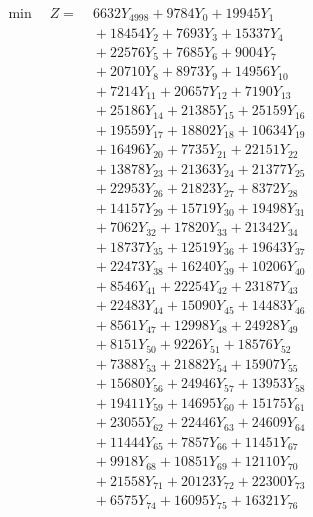 \documentclass[a4paper,10pt]{article}
\begin{document}
\allowdisplaybreaks
{\small
\begin{align}
\min \quad Z = &\; 6632 Y_{4998} + 9784 Y_{0} + 19945 Y_{1} \\[0.3ex]
&\;  + 18454 Y_{2} + 7693 Y_{3} + 15337 Y_{4} \\[0.3ex]
&\;  + 22576 Y_{5} + 7685 Y_{6} + 9004 Y_{7} \\[0.3ex]
&\;  + 20710 Y_{8} + 8973 Y_{9} + 14956 Y_{10} \\[0.3ex]
&\;  + 7214 Y_{11} + 20657 Y_{12} + 7190 Y_{13} \\[0.3ex]
&\;  + 25186 Y_{14} + 21385 Y_{15} + 25159 Y_{16} \\[0.3ex]
&\;  + 19559 Y_{17} + 18802 Y_{18} + 10634 Y_{19} \\[0.3ex]
&\;  + 16496 Y_{20} + 7735 Y_{21} + 22151 Y_{22} \\[0.3ex]
&\;  + 13878 Y_{23} + 21363 Y_{24} + 21377 Y_{25} \\[0.3ex]
&\;  + 22953 Y_{26} + 21823 Y_{27} + 8372 Y_{28} \\[0.5ex]\allowbreak
&\;  + 14157 Y_{29} + 15719 Y_{30} + 19498 Y_{31} \\[0.3ex]
&\;  + 7062 Y_{32} + 17820 Y_{33} + 21342 Y_{34} \\[0.3ex]
&\;  + 18737 Y_{35} + 12519 Y_{36} + 19643 Y_{37} \\[0.3ex]
&\;  + 22473 Y_{38} + 16240 Y_{39} + 10206 Y_{40} \\[0.3ex]
&\;  + 8546 Y_{41} + 22254 Y_{42} + 23187 Y_{43} \\[0.3ex]
&\;  + 22483 Y_{44} + 15090 Y_{45} + 14483 Y_{46} \\[0.3ex]
&\;  + 8561 Y_{47} + 12998 Y_{48} + 24928 Y_{49} \\[0.3ex]
&\;  + 8151 Y_{50} + 9226 Y_{51} + 18576 Y_{52} \\[0.3ex]
&\;  + 7388 Y_{53} + 21882 Y_{54} + 15907 Y_{55} \\[0.3ex]
&\;  + 15680 Y_{56} + 24946 Y_{57} + 13953 Y_{58} \\[0.5ex]\allowbreak
&\;  + 19411 Y_{59} + 14695 Y_{60} + 15175 Y_{61} \\[0.3ex]
&\;  + 23055 Y_{62} + 22446 Y_{63} + 24609 Y_{64} \\[0.3ex]
&\;  + 11444 Y_{65} + 7857 Y_{66} + 11451 Y_{67} \\[0.3ex]
&\;  + 9918 Y_{68} + 10851 Y_{69} + 12110 Y_{70} \\[0.3ex]
&\;  + 21558 Y_{71} + 20123 Y_{72} + 22300 Y_{73} \\[0.3ex]
&\;  + 6575 Y_{74} + 16095 Y_{75} + 16321 Y_{76} \\[0.3ex]

\end{align}}
\end{document}
